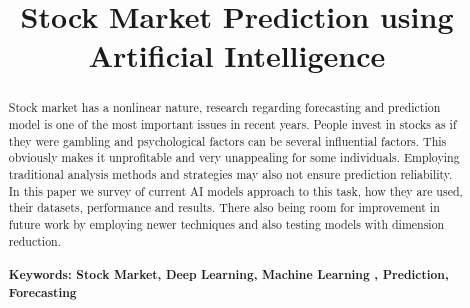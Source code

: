 \documentclass[conference]{IEEEtran}
\begin{document}
\title{Stock Market Prediction using \\Artificial Intelligence}
\author{
}
\maketitle
\begin{abstract}
Stock market has a nonlinear nature, research regarding forecasting and prediction model is one of the most important issues in recent years. 
People invest in stocks as if they were gambling and psychological factors can be several influential factors. This obviously makes it unprofitable 
and very unappealing for some individuals. Employing traditional analysis methods and strategies may also not ensure prediction reliability. In this 
paper we survey of current AI models approach to this task, how they are used, their datasets, performance and results. There also being room 
for improvement in future work by employing newer techniques and also testing models with dimension reduction.
\\\\
\textbf{Keywords: Stock  Market,  Deep Learning, Machine Learning , Prediction, Forecasting}
\end{abstract}
\IEEEpeerreviewmaketitle
\end{document}
